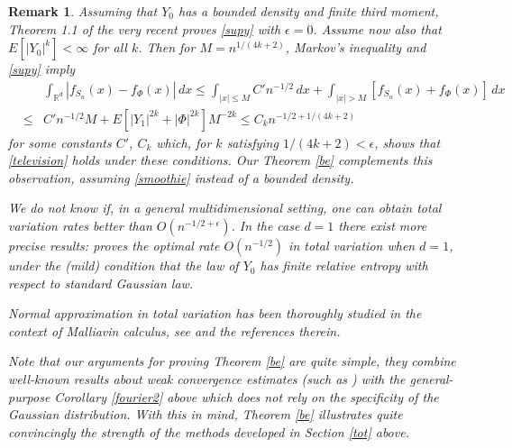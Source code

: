 \documentclass{article}
\newtheorem{remark}[theorem]{Remark}
\newtheorem{example}[theorem]{Example}
\begin{document}
\begin{remark}
{\rm Assuming that $Y_{0}$ has a bounded density and finite third moment, Theorem 1.1 of the very recent
\cite{bobkov-goetze}
proves \eqref{supy} with $\epsilon=0$. 
Assume now also that $E[|Y_{0}|^{k}]<\infty$ for all $k$. Then for $M=n^{1/(4k+2)}$, Markov's inequality and \eqref{supy} imply
\begin{eqnarray*}
& & \int_{\mathbb{R}^{d}}|f_{S_{n}}(x)-f_{\Phi}(x)|\, dx\leq \int_{|x|\leq M} C'n^{-1/2}\, dx 
+\int_{|x|>M} [f_{S_{n}}(x)+f_{\Phi}(x)]\, dx\\
&\leq& C'n^{-1/2}M+E[|Y_{1}|^{2k}+|\Phi|^{2k}]M^{-2k}\leq C_{k}n^{-1/2 +1/(4k+2)}
\end{eqnarray*} 
for some constants $C'$, $C_{k}$ which, for $k$ satisfying $1/(4k+2)<\epsilon$,
shows that \eqref{television} holds under these conditions.
Our Theorem \ref{be} complements this observation, assuming \eqref{smoothie} instead of a bounded
density.

We do not know if, in a general multidimensional setting, one can obtain total variation rates better than $O(n^{-1/2+\epsilon})$.
In the case $d=1$ there exist more precise results: \cite{bcg} proves the optimal rate $O(n^{-1/2})$ in total
variation when $d=1$, under
the (mild) condition that the law of $Y_{0}$ has finite relative entropy with respect to
standard Gaussian law. 

Normal approximation in total variation has been thoroughly studied in the
context of Malliavin calculus, see \cite{nourdin-peccati,bally,bc2} and the references therein.


Note that our arguments for proving Theorem \ref{be} are quite simple,
they combine well-known results about
weak convergence estimates (such as \cite{yurinskii}) with the general-purpose Corollary \ref{fourier2} above
which does not rely on the specificity of the Gaussian distribution. With this in mind, Theorem
\ref{be} illustrates quite convincingly the strength of the methods developed in Section \ref{tot} above.
}
\end{remark}

\end{document}
